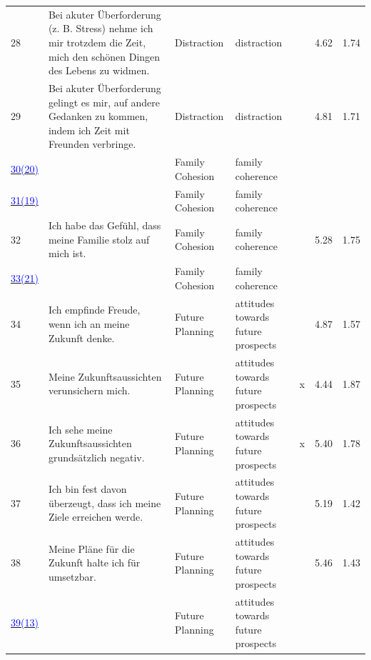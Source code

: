 \documentclass[
  man,floatsintext]{apa7}
\begin{document}
\begin{center}
\begin{ThreePartTable}
{\begin{longtable}{m{0.6cm}m{7.3cm}m{2.2cm}m{2.2cm}m{0.2cm}m{0.4cm}m{0.4cm}}
28 & Bei akuter Überforderung (z. B. Stress) nehme ich mir trotzdem die Zeit, mich den schönen Dingen des Lebens zu widmen. & Distraction & distraction &  & 4.62 & 1.74\\
29 & Bei akuter Überforderung gelingt es mir, auf andere Gedanken zu kommen, indem ich Zeit mit Freunden verbringe. & Distraction & distraction &  & 4.81 & 1.71\\
\label{famil_1_371}\hyperref[table1]{\textcolor{blue}{30(20)}} & \cellcolor{lightgray}{Meine Familie steht hinter mir, auch dann, wenn ich mich falsch verhalte.} & Family Cohesion & family coherence & \cellcolor{lightgray}{\ } & \cellcolor{lightgray}{5.53} & \cellcolor{lightgray}{1.67}\\
\label{famil_1_373}\hyperref[table1]{\textcolor{blue}{31(19)}} & \cellcolor{lightgray}{Ich kann mich auf die Unterstützung meiner Familie verlassen.} & Family Cohesion & family coherence & \cellcolor{lightgray}{\ } & \cellcolor{lightgray}{5.70} & \cellcolor{lightgray}{1.67}\\
32 & Ich habe das Gefühl, dass meine Familie stolz auf mich ist. & Family Cohesion & family coherence &  & 5.28 & 1.75\\
\label{famil_1_378}\hyperref[table1]{\textcolor{blue}{33(21)}} & \cellcolor{lightgray}{In meiner Familie unterstützen wir uns gegenseitig.} & Family Cohesion & family coherence & \cellcolor{lightgray}{\ } & \cellcolor{lightgray}{5.46} & \cellcolor{lightgray}{1.70}\\
34 & Ich empfinde Freude, wenn ich an meine Zukunft denke. & Future Planning & attitudes towards future prospects &  & 4.87 & 1.57\\
35 & Meine Zukunftsaussichten verunsichern mich. & Future Planning & attitudes towards future prospects & x & 4.44 & 1.87\\
36 & Ich sehe meine Zukunftsaussichten grundsätzlich negativ. & Future Planning & attitudes towards future prospects & x & 5.40 & 1.78\\
37 & Ich bin fest davon überzeugt, dass ich meine Ziele erreichen werde. & Future Planning & attitudes towards future prospects &  & 5.19 & 1.42\\
38 & Meine Pläne für die Zukunft halte ich für umsetzbar. & Future Planning & attitudes towards future prospects &  & 5.46 & 1.43\\
\label{zukun_1_339}\hyperref[table1]{\textcolor{blue}{39(13)}} & \cellcolor{lightgray}{Ich habe konkrete Ziele und entsprechend plane ich meine Zukunft.} & Future Planning & attitudes towards future prospects & \cellcolor{lightgray}{\ } & \cellcolor{lightgray}{4.92} & \cellcolor{lightgray}{1.64}\\

\end{longtable}}
\end{ThreePartTable}
\end{center}
\end{document}
